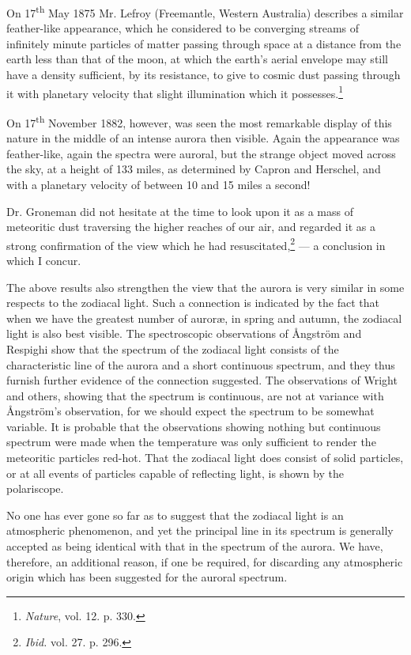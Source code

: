 \documentclass[a4paper, 12pt, oneside, polutonikogreek, english]{article}
\begin{document}
On 17\textsuperscript{th} May 1875 Mr. Lefroy (Freemantle, Western Australia) describes a similar feather-like appearance, which he considered to be converging streams of infinitely minute particles of matter passing through space at a distance from the earth less than that of the moon, at which the earth's aerial envelope may still have a density sufficient, by its resistance, to give to cosmic dust passing through it with planetary velocity that slight illumination which it possesses.\footnote{\emph{Nature}, vol. 12. p. 330.}

On 17\textsuperscript{th} November 1882, however, was seen the most remarkable display of this nature in the middle of an intense aurora then visible. Again the appearance was feather-like, again the spectra were auroral, but the strange object moved across the sky, at a height of 133 miles, as determined by Capron and Herschel, and with a planetary velocity of between 10 and 15 miles a second!

Dr. Groneman did not hesitate at the time to look upon it as a mass of meteoritic dust traversing the higher reaches of our air, and regarded it as a strong confirmation of the view which he had resuscitated,\footnote{\emph{Ibid.} vol. 27. p. 296.} --- a conclusion in which I concur.

The above results also strengthen the view that the aurora is very similar in some respects to the zodiacal light. Such a connection is indicated by the fact that when we have the greatest number of auroræ, in spring and autumn, the zodiacal light is also best visible. The spectroscopic observations of Ångström and Respighi show that the spectrum of the zodiacal light consists of the characteristic line of the aurora and a short continuous spectrum, and they thus furnish further evidence of the connection suggested. The observations of Wright and others, showing that the spectrum is continuous, are not at variance with Ångström's observation, for we should expect the spectrum to be somewhat variable. It is probable that the observations showing nothing but continuous spectrum were made when the temperature was only sufficient to render the meteoritic particles red-hot. That the zodiacal light does consist of solid particles, or at all events of particles capable of reflecting light, is shown by the polariscope.

No one has ever gone so far as to suggest that the zodiacal light is an atmospheric phenomenon, and yet the principal line in its spectrum is generally accepted as being identical with that in the spectrum of the aurora. We have, therefore, an additional reason, if one be required, for discarding any atmospheric origin which has been suggested for the auroral spectrum.
\clearpage
\end{document}
